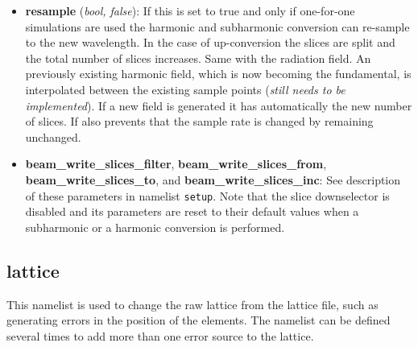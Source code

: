 \documentclass[12pt]{book}
\begin{document}
\begin{itemize}
\item {\bf resample} ({\it bool, false}): If this is set to true and only if one-for-one simulations are used the harmonic and subharmonic conversion can re-sample to the new wavelength. In the case of up-conversion the slices are split and the total number of slices increases. Same with the radiation field. An previously existing harmonic field, which is now becoming the fundamental, is interpolated between the existing sample points ({\it still needs to be implemented}). If a new field is generated it has automatically the new number of slices. If also prevents that the sample rate is changed by remaining unchanged.

\item {\bf beam\_write\_slices\_filter}, {\bf beam\_write\_slices\_from}, {\bf beam\_write\_slices\_to}, and {\bf beam\_write\_slices\_inc}: See description of these parameters in namelist {\tt setup}. Note that the slice downselector is disabled and its parameters are reset to their default values when a subharmonic or a harmonic conversion is performed.

\end{itemize}



\subsection{\sf lattice}

This namelist is used to change the raw lattice from the lattice file, such as generating errors in the position of the elements. The namelist can be defined several times to add more than one error source to the lattice.
\end{document}
